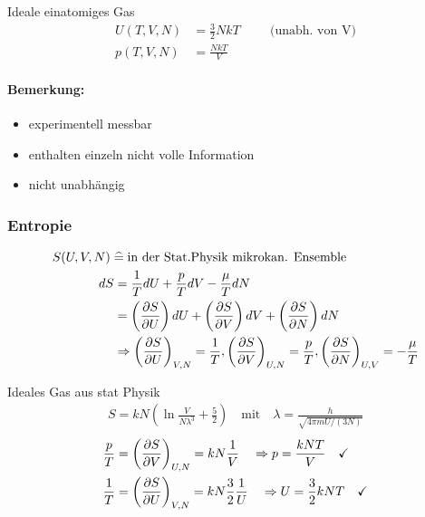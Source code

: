 \begin{beispiel}{Ideale einatomiges Gas}
    \begin{align}
        U(T,V,N)&=\frac{3}{2}NkT \hspace{1cm} \text{(unabh. von V)}\\
        p(T,V,N)&=\frac{NkT}{V}
    \end{align}
\end{beispiel}

\paragraph{Bemerkung:}
\begin{itemize}
    \item experimentell messbar
    \item enthalten einzeln nicht volle Information
    \item nicht unabhängig
\end{itemize}


\subsubsection{Entropie}
\begin{align}
    S(U,V,N) \; &\widehat{=} \; \text{in der Stat.Physik mikrokan. Ensemble} \\
    dS &= \frac{1}{T}dU + \frac{p}{T}dV-\frac{\mu}{T}dN\\
    &= \left(\frac{\partial S}{\partial U}\right)dU +\left(\frac{\partial S}{\partial V}\right)dV + \left(\frac{\partial S}{\partial N}\right)dN\\
    &\Rightarrow \left(\frac{\partial S}{\partial U}\right)_{V,N}=\frac{1}{T}, \left(\frac{\partial S}{\partial V}\right)_{U,N}=\frac{p}{T},\left(\frac{\partial S}{\partial N}\right)_{U,V}=-\frac{\mu}{T}
\end{align}

\begin{beispiel}{Ideales Gas}
aus stat Physik
    \begin{align}
        S=kN\left(\ln \frac{V}{N\lambda^3} + \frac{5}{2}\right) \quad \text{mit} \quad \lambda=\frac{h}{\sqrt{4\pi m U/(3N)}}
    \end{align}
    \begin{align}
        \frac{p}{T} &=\left(\frac{\partial S}{\partial V}\right)_{U,N}=kN\frac{1}{V} \quad \Rightarrow p=\frac{kNT}{V} \quad \checkmark\\
        \frac{1}{T} &=\left(\frac{\partial S}{\partial U}\right)_{V,N}=kN\frac{3}{2}\frac{1}{U} \quad \Rightarrow U=\frac{3}{2}kNT \quad \checkmark
    \end{align}
\end{beispiel}



